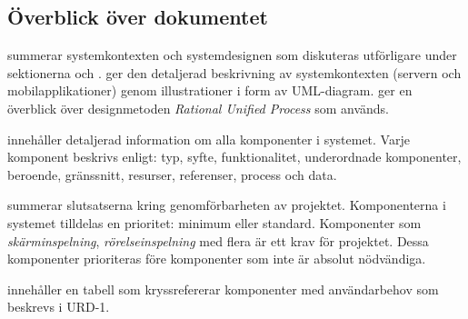 \subsection{Överblick över dokumentet}

 summerar systemkontexten och systemdesignen som diskuteras utförligare under sektionerna  och .  ger den detaljerad beskrivning av systemkontexten (servern och mobilapplikationer) genom illustrationer i form av UML-diagram.  ger en överblick över designmetoden \textit{Rational Unified Process} som används.

 innehåller detaljerad information om alla komponenter i systemet. Varje komponent beskrivs enligt: typ, syfte, funktionalitet, underordnade komponenter, beroende, gränssnitt, resurser, referenser, process och data.

 summerar slutsatserna kring genomförbarheten av projektet. Komponenterna i systemet tilldelas en prioritet: minimum eller standard. Komponenter som \textit{skärminspelning}, \textit{rörelseinspelning} med flera är ett krav för projektet. Dessa komponenter prioriteras före komponenter som inte är absolut nödvändiga.

 innehåller en tabell som kryssrefererar komponenter med användarbehov som beskrevs i URD-1.